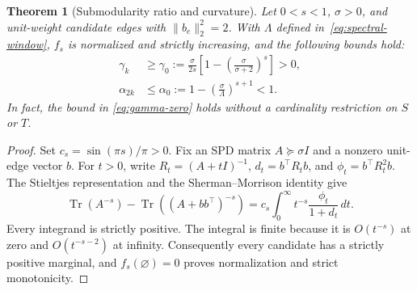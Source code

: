 \documentclass[conference]{IEEEtran}
\newtheorem{theorem}{Theorem}
\theoremstyle{definition}
\DeclareMathOperator{\Tr}{Tr}
\begin{document}
\begin{theorem}[Submodularity ratio and curvature]
\label{thm:ratio-curvature}
Let $0<s<1$, $\sigma>0$, and unit-weight candidate edges with
$\|b_e\|_2^2=2$. With $\Lambda$ defined in~\eqref{eq:spectral-window},
$f_s$ is normalized and strictly increasing, and the following
bounds hold:
\begin{align}
 \gamma_k&\geq\gamma_0
 :=\frac{\sigma}{2s}
       \left[1-\left(\frac{\sigma}{\sigma+2}\right)^s\right]>0,
 \label{eq:gamma-zero}\\
 \alpha_{2k}&\leq\alpha_0
 :=1-\left(\frac{\sigma}{\Lambda}\right)^{s+1}<1.
 \label{eq:alpha-zero}
\end{align}
In fact, the bound in \eqref{eq:gamma-zero} holds without a cardinality
restriction on $S$ or $T$.
\end{theorem}
\begin{proof}
Set $c_s=\sin(\pi s)/\pi>0$.  Fix an SPD matrix $A\succeq\sigma I$
and a nonzero unit-edge vector $b$.  For $t>0$, write
$R_t=(A+t I)^{-1}$,
$d_t=b^\top R_t b$, and
${\phi}_t=b^\top R_t^2b$.
The Stieltjes representation and the Sherman--Morrison identity give
\begin{equation}
 \Tr(A^{-s})-\Tr((A+bb^\top)^{-s})
 =c_s\int_0^\infty{ t}^{-s}
                 \frac{{\phi}_t}{1+d_t}\,dt.
 \label{eq:ratio-sm-integral}
\end{equation}
Every integrand is strictly positive.  The integral is finite because
it is $O(t^{-s})$ at zero and $O(t^{-s-2})$ at infinity.
Consequently every candidate has a strictly positive marginal, and
$f_s(\varnothing)=0$ proves normalization and strict monotonicity.


\end{proof}
\end{document}
